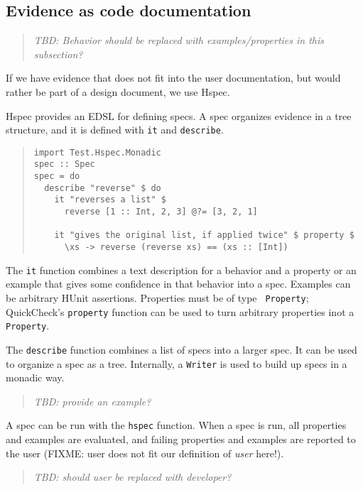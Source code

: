 \documentclass[preprint]{sigplanconf}
\newcommand{\hspec}{Hspec}
\begin{document}
\subsection{Evidence as code documentation}
\label{sec:for-developers}

\begin{quote}
    \emph{TBD: Behavior should be replaced with examples/properties in this subsection?}
\end{quote}

If we have evidence that does not fit into the user documentation, but would
rather be part of a design document, we use \hspec{}.

\hspec{} provides an EDSL for defining specs.  A spec organizes evidence in a
tree structure, and it is defined with \texttt{it} and \texttt{describe}.

\begin{quote}
\small
\begin{verbatim}
import Test.Hspec.Monadic
spec :: Spec
spec = do
  describe "reverse" $ do
    it "reverses a list" $
      reverse [1 :: Int, 2, 3] @?= [3, 2, 1]

    it "gives the original list, if applied twice" $ property $
      \xs -> reverse (reverse xs) == (xs :: [Int])
\end{verbatim}
\end{quote}

\noindent The {\tt it} function combines a text description for a behavior and
a property or an example that gives some confidence in that behavior into a
spec.
Examples can be arbitrary HUnit assertions.  Properties must be of type {\tt
Property}; QuickCheck's \texttt{property} function can be used to turn
arbitrary properties inot a \texttt{Property}.

The \texttt{describe} function combines a list of specs into a larger spec.  It
can be used to organize a spec as a tree.
Internally, a \texttt{Writer} is used to build up specs in a monadic way.

\begin{quote}
    \emph{TBD: provide an example?}
\end{quote}

A spec can be run with the \texttt{hspec} function.  When a spec is run, all
properties and examples are evaluated, and failing properties and examples are
reported to the user (FIXME: user does not fit our definition of \emph{user}
here!).

\begin{quote}
    \emph{TBD: should user be replaced with developer?}
\end{quote}
\end{document}
